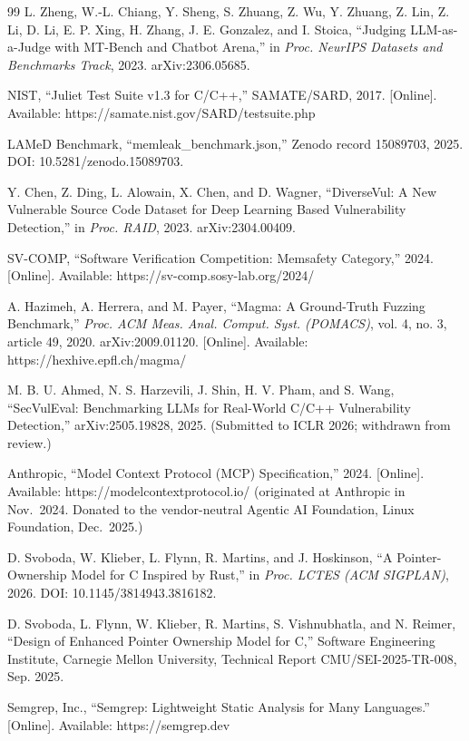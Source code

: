 \documentclass[11pt,a4paper]{article}
\begin{document}
\begin{thebibliography}{99}
 L. Zheng, W.-L. Chiang, Y. Sheng, S. Zhuang, Z. Wu, Y. Zhuang, Z. Lin, Z. Li, D. Li, E. P. Xing, H. Zhang, J. E. Gonzalez, and I. Stoica, ``Judging LLM-as-a-Judge with MT-Bench and Chatbot Arena,'' in \textit{Proc. NeurIPS Datasets and Benchmarks Track}, 2023. arXiv:2306.05685.

 NIST, ``Juliet Test Suite v1.3 for C/C++,'' SAMATE/SARD, 2017. [Online]. Available: https://samate.nist.gov/SARD/testsuite.php

 LAMeD Benchmark, ``memleak\_benchmark.json,'' Zenodo record 15089703, 2025. DOI: 10.5281/zenodo.15089703.

 Y. Chen, Z. Ding, L. Alowain, X. Chen, and D. Wagner, ``DiverseVul: A New Vulnerable Source Code Dataset for Deep Learning Based Vulnerability Detection,'' in \textit{Proc. RAID}, 2023. arXiv:2304.00409.

 SV-COMP, ``Software Verification Competition: Memsafety Category,'' 2024. [Online]. Available: https://sv-comp.sosy-lab.org/2024/

 A. Hazimeh, A. Herrera, and M. Payer, ``Magma: A Ground-Truth Fuzzing Benchmark,'' \textit{Proc. ACM Meas. Anal. Comput. Syst. (POMACS)}, vol. 4, no. 3, article 49, 2020. arXiv:2009.01120. [Online]. Available: https://hexhive.epfl.ch/magma/

 M. B. U. Ahmed, N. S. Harzevili, J. Shin, H. V. Pham, and S. Wang, ``SecVulEval: Benchmarking LLMs for Real-World C/C++ Vulnerability Detection,'' arXiv:2505.19828, 2025. (Submitted to ICLR 2026; withdrawn from review.)

 Anthropic, ``Model Context Protocol (MCP) Specification,'' 2024. [Online]. Available: https://modelcontextprotocol.io/ (originated at Anthropic in Nov.\ 2024. Donated to the vendor-neutral Agentic AI Foundation, Linux Foundation, Dec.\ 2025.)

 D. Svoboda, W. Klieber, L. Flynn, R. Martins, and J. Hoskinson, ``A Pointer-Ownership Model for C Inspired by Rust,'' in \textit{Proc. LCTES (ACM SIGPLAN)}, 2026. DOI: 10.1145/3814943.3816182.

 D. Svoboda, L. Flynn, W. Klieber, R. Martins, S. Vishnubhatla, and N. Reimer, ``Design of Enhanced Pointer Ownership Model for C,'' Software Engineering Institute, Carnegie Mellon University, Technical Report CMU/SEI-2025-TR-008, Sep. 2025.

 Semgrep, Inc., ``Semgrep: Lightweight Static Analysis for Many Languages.'' [Online]. Available: https://semgrep.dev


\end{thebibliography}
\end{document}
